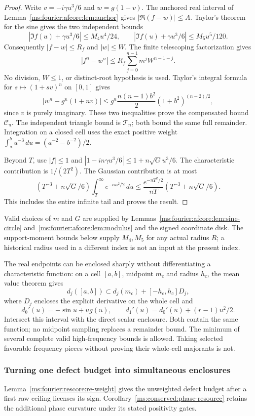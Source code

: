 \begin{proof}
Write $v=-i\gamma u^3/6$ and $w=g(1+v)$.
The anchored real interval of Lemma~\ref{ms:fourier:afcore:lem:anchor} gives
$|\Re(f-w)|\le A$. Taylor's theorem for the sine gives the two
independent bounds
\[
 |\Im f(u)+\gamma u^3/6|\le M_4u^4/24,
 \qquad |\Im f(u)+\gamma u^3/6|\le M_5u^5/120.
\]
Consequently $|f-w|\le R_f$ and $|w|\le W$.
The finite telescoping factorization gives
\[
 |f^n-w^n|\le R_f\sum_{j=0}^{n-1}m^jW^{n-1-j}.
\]
No division, $W\le1$, or distinct-root hypothesis is used.
Taylor's integral formula for $s\mapsto(1+sv)^n$ on $[0,1]$ gives
\[
 |w^n-g^n(1+nv)|\le
 g^n\frac{n(n-1)b^2}{2}(1+b^2)^{(n-2)/2},
\]
since $v$ is purely imaginary. These two inequalities prove the
compensated bound $\mathcal C_n$. The independent triangle bound is
$\mathcal T_n$; both bound the same full remainder.
Integration on a closed cell uses the exact positive weight
$\int_a^b u^{-3}\,du=(a^{-2}-b^{-2})/2$.

Beyond $T$, use $|f|\le1$ and
$|1-in\gamma u^3/6|\le1+n\sqrt G u^3/6$.
The characteristic contribution is $1/(2T^2)$.
The Gaussian contribution is at most
\[
 \left(T^{-3}+n\sqrt G/6\right)
 \int_T^\infty e^{-nu^2/2}\,du
 \le\frac{e^{-nT^2/2}}{nT}
       \left(T^{-3}+n\sqrt G/6\right).
\]
This includes the entire infinite tail and proves the result.
\end{proof}

Valid choices of $m$ and $G$ are supplied by
Lemmas~\ref{ms:fourier:afcore:lem:sine-circle} and~\ref{ms:fourier:afcore:lem:modulus}
and the signed coordinate disk. The support-moment bounds below supply
$M_4,M_5$ for any actual radius $R$; a historical radius used in a
different index is not an input at the present index.

The real endpoints can be enclosed sharply without differentiating a
characteristic function: on a cell $[a,b]$, midpoint $m_c$ and radius
$h_c$, the mean value theorem gives
\[
 d_j([a,b])\subset d_j(m_c)+[-h_c,h_c]D_j,
\]
where $D_j$ encloses the explicit derivative on the whole cell and
\[
 d_0'(u)=-\sin u+ug(u),\qquad
 d_1'(u)=d_0'(u)+(r-1)u^2/2.
\]
Intersect this interval with the direct scalar enclosure. Both contain
the same function; no midpoint sampling replaces a remainder bound.
The minimum of several complete valid high-frequency bounds is allowed. Taking
selected favorable frequency pieces without proving their whole-cell
majorants is not.

\subsubsection{Turning one defect budget into simultaneous enclosures}
Lemma~\ref{ms:fourier:rescore:re-weight} gives the unweighted defect
budget after a first raw ceiling licenses its sign. Corollary~\ref{ms:conserved:phase-resource}
retains the additional phase curvature under its stated positivity gates.

